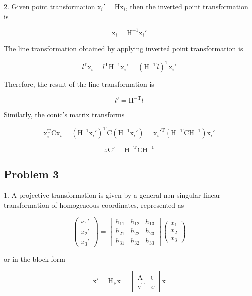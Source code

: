 \documentclass[conference]{IEEEtran}
\begin{document}
2. Given point transformation \(\mathrm{x}_{i}{'} = \mathrm{H}\mathrm{x}_i\), then the inverted point transformation is 

\[\mathrm{x}_i = \mathrm{H}^{-1}\mathrm{x}_{i}{'}\]

The line transformation obtained by applying inverted point transformation is 

\[l^\mathrm{T}\mathrm{x}_i = l^\mathrm{T}\mathrm{H}^{-1}\mathrm{x}_{i}{'} =
{(\mathrm{H}^\mathrm{-T}l)}^\mathrm{T}\mathrm{x}_{i}{'} \]

Therefore, the result of the line transformation is 

\[l{'} = \mathrm{H}^\mathrm{-T}l \]

Similarly, the conic's matrix transforms 

\[ \mathrm{x}_i^\mathrm{T}\mathrm{C}\mathrm{x}_i =  (\mathrm{H}^{-1}\mathrm{x}_{i}{'})^\mathrm{T}\mathrm{C}(\mathrm{H}^{-1}\mathrm{x}_{i}{'}) =
\mathrm{x}_{i}{'}^\mathrm{T}(\mathrm{H}^\mathrm{-T}\mathrm{C}\mathrm{H}^{-1})\mathrm{x}_{i}{'} \]

\[ \therefore \mathrm{C}{'} = \mathrm{H}^\mathrm{-T}\mathrm{C}\mathrm{H}^{-1} \]

\clearpage
\subsection{Problem 3}

1. A projective transformation is given by a general non-singular linear transformation of homogeneous coordinates, represented as

\[ \begin{pmatrix} x_1{'}\\x_2{'}\\x_3{'} \end{pmatrix} = 
\begin{bmatrix}
h_{11} & h_{12} & h_{13}\\
h_{21} & h_{22} & h_{23}\\
h_{31} & h_{32} & h_{33}
\end{bmatrix}\begin{pmatrix} x_1\\x_2\\x_3 \end{pmatrix}
 \]
 
 or in the block form
 
 \[ \mathrm{x}{'} = \mathrm{H}_\mathrm{P}\mathrm{x} = 
 \begin{bmatrix}
\mathrm{A}& \mathrm{t} \\
\mathrm{v}^\mathrm{T} & \upsilon
\end{bmatrix}\mathrm{x}
 \]
\end{document}
